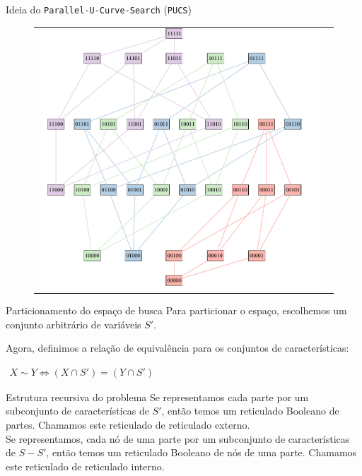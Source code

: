 \documentclass{beamer}
\newcommand{\algname}[1]{\texttt{#1}}
\begin{document}
\begin{frame}{Ideia do \algname{Parallel-U-Curve-Search} (\algname{PUCS})}
\begin{figure}[!ht]
\begin{tabular}{c c}
{{    \includegraphics[clip=true]{pucs/partition/all_parts.pdf}}}\\
  \end{tabular}
\end{figure}
\end{frame}


\begin{frame}{Particionamento do espaço de busca}
Para particionar o espaço, escolhemos um conjunto arbitrário de 
variáveis $S'$. \pause

Agora, definimos a relação de equivalência para os conjuntos de 
características: \\
\begin{center}
$
\begin{aligned}
    X \sim Y \iff (X \cap S') = (Y \cap S')
\end{aligned}
$
\end{center}
\end{frame}

\begin{frame}{Estrutura recursiva do problema}
    Se representamos cada parte por um subconjunto de características de
    $S'$, então temos um reticulado Booleano de partes. Chamamos este
    reticulado de \alert{reticulado externo}.
    \vspace{1em}\\
    \pause
    Se representamos, cada nó de uma parte por um subconjunto de 
    características de $S - S'$, então temos um reticulado Booleano
    de nós de uma parte. Chamamos este reticulado de \alert{reticulado
    interno}.
\end{frame}
\end{document}
